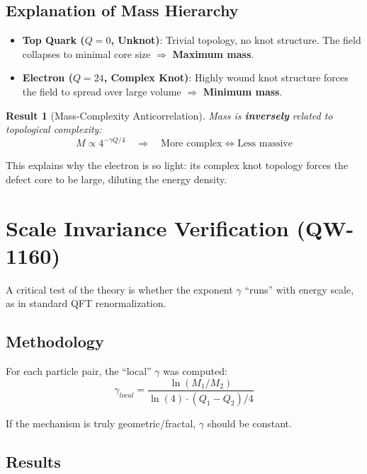 \documentclass[11pt, a4paper]{article}
\newtheorem{result}{Result}[section]
\theoremstyle{remark}
\newcommand{\QW}[1]{\textbf{QW-#1}}
\begin{document}
\subsection{Explanation of Mass Hierarchy}

\begin{itemize}
    \item \textbf{Top Quark ($Q = 0$, Unknot)}: Trivial topology, no knot structure. The field collapses to minimal core size $\Rightarrow$ \textbf{Maximum mass}.
    
    \item \textbf{Electron ($Q = 24$, Complex Knot)}: Highly wound knot structure forces the field to spread over large volume $\Rightarrow$ \textbf{Minimum mass}.
\end{itemize}

\begin{result}[Mass-Complexity Anticorrelation]
Mass is \textbf{inversely} related to topological complexity:
\begin{equation}
M \propto 4^{-\gamma Q/4} \quad \Rightarrow \quad \text{More complex} \Leftrightarrow \text{Less massive}
\end{equation}
\end{result}

This explains why the electron is so light: its complex knot topology forces the defect core to be large, diluting the energy density.

\section{Scale Invariance Verification (\QW{1160})}

A critical test of the theory is whether the exponent $\gamma$ ``runs'' with energy scale, as in standard QFT renormalization.

\subsection{Methodology}

For each particle pair, the ``local'' $\gamma$ was computed:
\begin{equation}
\gamma_{local} = \frac{\ln(M_1/M_2)}{\ln(4) \cdot (Q_1 - Q_2)/4}
\end{equation}

If the mechanism is truly geometric/fractal, $\gamma$ should be constant.

\subsection{Results}
\end{document}
